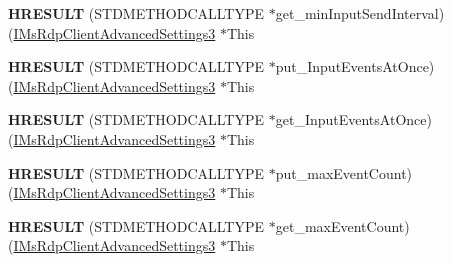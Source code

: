 \begin{DoxyCompactItemize}
\item 
\mbox{\label{struct_m_s_t_s_c_lib_1_1_i_ms_rdp_client_advanced_settings3_vtbl_ab055910ef3b6c359160a3ec0ff9528ec}} 
{\bfseries H\+R\+E\+S\+U\+LT} (S\+T\+D\+M\+E\+T\+H\+O\+D\+C\+A\+L\+L\+T\+Y\+PE $\ast$get\+\_\+min\+Input\+Send\+Interval)(\hyperlink{interface_m_s_t_s_c_lib_1_1_i_ms_rdp_client_advanced_settings3}{I\+Ms\+Rdp\+Client\+Advanced\+Settings3} $\ast$This
\item 
\mbox{\label{struct_m_s_t_s_c_lib_1_1_i_ms_rdp_client_advanced_settings3_vtbl_a824c360664d4a82543a98d47b9569b86}} 
{\bfseries H\+R\+E\+S\+U\+LT} (S\+T\+D\+M\+E\+T\+H\+O\+D\+C\+A\+L\+L\+T\+Y\+PE $\ast$put\+\_\+\+Input\+Events\+At\+Once)(\hyperlink{interface_m_s_t_s_c_lib_1_1_i_ms_rdp_client_advanced_settings3}{I\+Ms\+Rdp\+Client\+Advanced\+Settings3} $\ast$This
\item 
\mbox{\label{struct_m_s_t_s_c_lib_1_1_i_ms_rdp_client_advanced_settings3_vtbl_a099ada5e0818f71611109af40b9cc371}} 
{\bfseries H\+R\+E\+S\+U\+LT} (S\+T\+D\+M\+E\+T\+H\+O\+D\+C\+A\+L\+L\+T\+Y\+PE $\ast$get\+\_\+\+Input\+Events\+At\+Once)(\hyperlink{interface_m_s_t_s_c_lib_1_1_i_ms_rdp_client_advanced_settings3}{I\+Ms\+Rdp\+Client\+Advanced\+Settings3} $\ast$This
\item 
\mbox{\label{struct_m_s_t_s_c_lib_1_1_i_ms_rdp_client_advanced_settings3_vtbl_a6d4ad9a4f4500554a7e74a90f66e4ca5}} 
{\bfseries H\+R\+E\+S\+U\+LT} (S\+T\+D\+M\+E\+T\+H\+O\+D\+C\+A\+L\+L\+T\+Y\+PE $\ast$put\+\_\+max\+Event\+Count)(\hyperlink{interface_m_s_t_s_c_lib_1_1_i_ms_rdp_client_advanced_settings3}{I\+Ms\+Rdp\+Client\+Advanced\+Settings3} $\ast$This
\item 
\mbox{\label{struct_m_s_t_s_c_lib_1_1_i_ms_rdp_client_advanced_settings3_vtbl_a96ff95cbbad9d2d47588b53fbac05b52}} 
{\bfseries H\+R\+E\+S\+U\+LT} (S\+T\+D\+M\+E\+T\+H\+O\+D\+C\+A\+L\+L\+T\+Y\+PE $\ast$get\+\_\+max\+Event\+Count)(\hyperlink{interface_m_s_t_s_c_lib_1_1_i_ms_rdp_client_advanced_settings3}{I\+Ms\+Rdp\+Client\+Advanced\+Settings3} $\ast$This
\item 

\end{DoxyCompactItemize}
